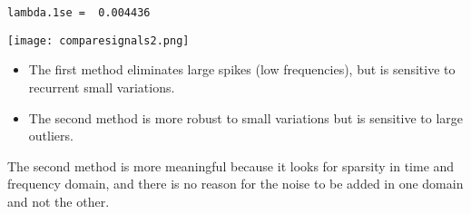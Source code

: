 \documentclass[11pt]{article}
\begin{document}
\begin{verbatim}
lambda.1se =  0.004436
\end{verbatim}


\texttt{[image: comparesignals2.png]}

\begin{itemize}
\item The first method eliminates large spikes (low frequencies), but is sensitive to recurrent small variations.
\item The second method is more robust to small variations but is sensitive to large outliers.
\end{itemize}

The second method is more meaningful because it looks for sparsity in time and frequency domain, and there is no reason for the noise to be added in one domain and not the other.



\end{document}
